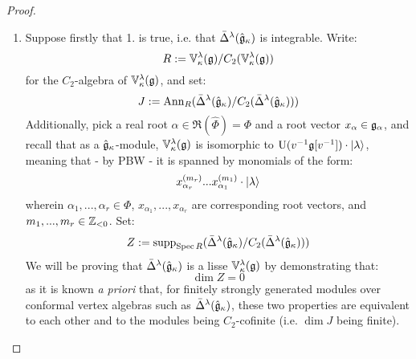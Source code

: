             \begin{proof}
                \begin{enumerate}
                    \item Suppose firstly that 1. is true, i.e. that $\bar{\Delta}^{\lambda}(\hat{\mathfrak{g}}_{\kappa})$ is integrable. Write:
                        $$R := \mathbb{V}_{\kappa}^{\lambda}(\mathfrak{g})/C_2( \mathbb{V}_{\kappa}^{\lambda}(\mathfrak{g}) )$$
                    for the $C_2$-algebra of $\mathbb{V}_{\kappa}^{\lambda}(\mathfrak{g})$, and set:
                        $$J := \mathrm{Ann}_R( \bar{\Delta}^{\lambda}(\hat{\mathfrak{g}}_{\kappa})/C_2( \bar{\Delta}^{\lambda}(\hat{\mathfrak{g}}_{\kappa}) ) )$$
                    Additionally, pick a real root $\alpha \in \Re(\hat{\Phi}) = \Phi$ and a root vector $x_{\alpha} \in \mathfrak{g}_{\alpha}$, and recall that as a $\hat{\mathfrak{g}}_{\kappa}$-module, $\mathbb{V}_{\kappa}^{\lambda}(\mathfrak{g})$ is isomorphic to $\mathrm{U}(v^{-1} \mathfrak{g}[v^{-1}]) \cdot \lvert {\lambda} \rangle$, meaning that - by PBW - it is spanned by monomials of the form:
                        $$x_{\alpha_r}^{(m_r)} ... x_{\alpha_1}^{(m_1)} \cdot \lvert {\lambda} \rangle$$
                    wherein $\alpha_1, ..., \alpha_r \in \Phi$, $x_{\alpha_1}, ..., x_{\alpha_r}$ are corresponding root vectors, and $m_1, ..., m_r \in \mathbb{Z}_{< 0}$. Set:
                        $$Z := \operatorname{supp}_{\operatorname{Spec} R}( \bar{\Delta}^{\lambda}(\hat{\mathfrak{g}}_{\kappa})/C_2( \bar{\Delta}^{\lambda}(\hat{\mathfrak{g}}_{\kappa}) ) )$$
                    We will be proving that $\bar{\Delta}^{\lambda}(\hat{\mathfrak{g}}_{\kappa})$ is a lisse $\mathbb{V}_{\kappa}^{\lambda}(\mathfrak{g})$ by demonstrating that:
                        $$\dim Z = 0$$
                    as it is known \textit{a priori} that, for finitely strongly generated modules over conformal vertex algebras such as $\bar{\Delta}^{\lambda}(\hat{\mathfrak{g}}_{\kappa})$, these two properties are equivalent to each other and to the modules being $C_2$-cofinite (i.e. $\dim J$ being finite).
                    

\end{enumerate}
\end{proof}
